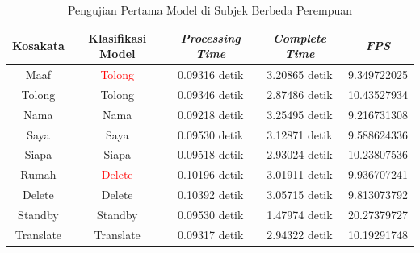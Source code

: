 \begin{longtable}{|c|c|c|c|c|}
  \caption{Pengujian Pertama Model di Subjek Berbeda Perempuan}
  \label{tb:prediksiperempuan1}                                   \\
  \hline
  \rowcolor[HTML]{C0C0C0}
  \textbf{Kosakata} & \textbf{Klasifikasi Model} & \textbf{\emph{Processing Time}} & \textbf{\emph{Complete Time}} & \textbf{\emph{FPS}}\\
  \hline
  Maaf              & \textcolor{red}{Tolong}       & 0.09316 detik                           & 3.20865 detik                                  & 9.349722025\\
  Tolong            & Tolong                        & 0.09346 detik                           & 2.87486 detik                                  & 10.43527934\\
  Nama              & Nama                          & 0.09218 detik                           & 3.25495 detik                                  & 9.216731308\\
  Saya              & Saya                          & 0.09530 detik                           & 3.12871 detik                                  & 9.588624336\\
  Siapa             & Siapa                         & 0.09518 detik                           & 2.93024 detik                                  & 10.23807536\\
  Rumah             & \textcolor{red}{Delete}       & 0.10196 detik                           & 3.01911 detik                                  & 9.936707241\\
  Delete            & Delete                        & 0.10392 detik                           & 3.05715 detik                                  & 9.813073792\\
  Standby           & Standby                       & 0.09530 detik                           & 1.47974 detik                                  & 20.27379727\\
  Translate         & Translate                     & 0.09317 detik                           & 2.94322 detik                                  & 10.19291748\\
  \hline
\end{longtable}



